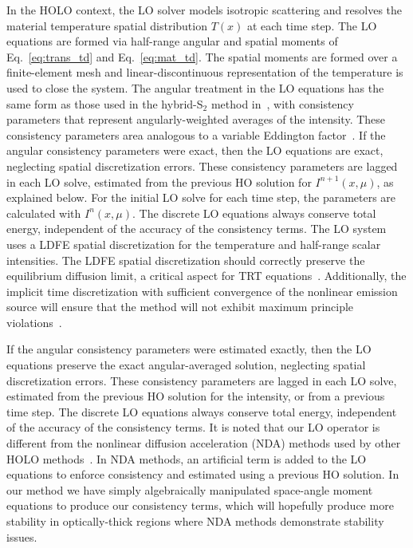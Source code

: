 In the HOLO context, the LO solver models isotropic scattering and
resolves the material temperature spatial distribution $T(x)$ at each time step.  The LO equations are formed via half-range 
angular and spatial moments of
Eq.~\eqref{eq:trans_td} and Eq.~\eqref{eq:mat_td}. The spatial moments are formed over a
finite-element mesh and linear-discontinuous representation of the temperature is used to
close the system.  The angular treatment in the LO equations has the same form as those
used in the hybrid-S$_2$ method in~\cite{wolters},  with consistency parameters that
represent angularly-weighted averages of the intensity.  These consistency parameters
area analogous to a variable Eddington factor~\cite{chandrasekhar}.  If the angular consistency parameters were exact, then the LO
equations are exact, neglecting spatial discretization errors.  These consistency
parameters are lagged in each LO solve, estimated from the previous HO solution for
$I^{n+1}(x,\mu)$, as explained below. For the initial LO solve for each time step, the
parameters are calculated with $I^{n}(x,\mu)$.  The discrete LO equations always conserve
total energy, independent of the accuracy of the consistency terms.  The LO system uses a
LDFE spatial discretization for the temperature and half-range scalar intensities.  The
LDFE spatial discretization should correctly preserve the equilibrium diffusion limit, a
critical aspect for TRT equations~\cite{larsen_edl,morel_newton}.  Additionally, the
implicit time discretization with sufficient convergence of the nonlinear emission source
will ensure that the method will not exhibit maximum principle
violations~\cite{larsen_mpv}.

If the angular consistency parameters were estimated exactly, then
the LO equations preserve the exact angular-averaged solution,  neglecting spatial
discretization errors.  These consistency parameters are lagged in each LO solve,
estimated from the previous HO solution for the intensity, or from a previous time
step.  The discrete LO equations always conserve total energy, independent of the accuracy of the consistency terms.
It is noted that our LO operator is different from the nonlinear
diffusion acceleration (NDA) methods used by other HOLO methods~\cite{rmc,park,willert}.  In
NDA methods, an artificial term is added to the LO equations to enforce consistency and estimated using a
previous HO solution.  In our method we have simply algebraically 
manipulated space-angle moment equations to produce our consistency terms,
which will hopefully produce more
stability in optically-thick regions where NDA methods demonstrate stability issues.

